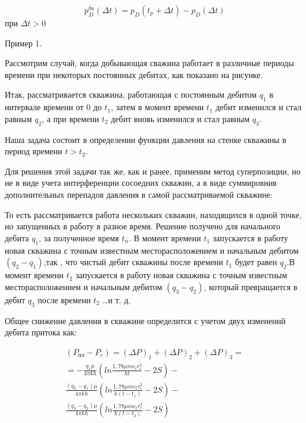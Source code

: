 $$ p_{D}^{bu}(\Delta t)=p_D(t_p +\Delta t) - p_D(\Delta t)$$  при $\Delta t > 0$

Пример 1.

Рассмотрим случай, когда добывающая сважина работает в различные периоды времени при некоторых постоянных дебитах, как показано на рисунке.  



Итак, рассматривается скважина, работающая с постоянным дебитом $q_1$ в интервале времени от 0 до $t_1$, затем в момент времени $t_1$ дебит изменился и стал равным $q_2$, а при времени $t_2$ дебит вновь изменился и стал равным $q_3$.

Наша задача состоит в определении функции давления на стенке скважины в период времени $t>t_2$.

Для решения этой задачи так же, как и ранее, применим метод суперпозиции, но не в виде учета интерференции сосоедних скважин, а в виде суммировния дополнительных перепадов давления в самой рассматриваемой скважине:

То есть рассматривается работа нескольких скважин, находящихся в одной точке, но запущенных в работу в разное время. Решение получено для начального дебита $q_1$, за полученное время $t_n$. В момент времени $t_1$ запускается в работу новая скважина с точным известным месторасположением и начальным дебитом $ \left(q_2 - q_1\right)$,так , что чистый дебит скважины после времени  $t_1$ будет равен  $q_2$.В момент времени $t_2$ запускается в работу новая скважина с точным известным месторасположением и начальным дебитом $ \left(q_3 - q_2\right)$, который превращается в дебит $q_3$ после времени $t_2$ …и т. д.

Общее снижение давления в скважине определится с учетом двух изменений дебита притока как:

\begin{eqnarray}
\left( P_{пл} - P_c\right) = \left( \Delta P\right)_1 + \left( \Delta P\right)_2 +\left( \Delta P\right)_3 = \nonumber  \\ 
= - \frac{q_1 \mu}{4\pi kh} \left( ln \frac{1,78 \mu m c_t r_c^2}{kt}-2S \right) - \nonumber  \\ 
\frac{ \left(q_2 - q_1\right)\mu}{4\pi kh} \left( ln \frac{1,78 \mu m c_t r_c^2}{k\left(t-t_1\right)}-2S \right)- \nonumber  \\ 
\frac{ \left(q_3 - q_2\right)\mu}{4\pi kh} \left( ln \frac{1,78 \mu m c_t r_c^2}{k\left(t-t_2\right)}-2S \right)
\end{eqnarray}



